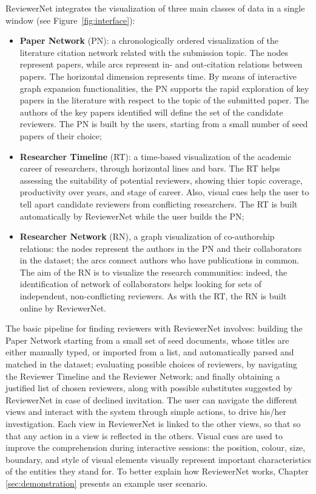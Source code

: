 ReviewerNet integrates the visualization of three main classes of data in a single window (see Figure~\ref{fig:interface}):

\begin{itemize}
\item  {\bf Paper Network} (PN): a chronologically ordered visualization of the literature citation network related with the submission topic. The nodes represent papers, while arcs represent in- and out-citation relations between papers. The horizontal dimension represents time. By means of interactive graph expansion functionalities, the PN supports the rapid exploration of key papers in the literature with respect to the topic of the submitted paper. The authors of the key papers identified will define the set of the candidate reviewers. The PN is built by the users, starting from a small number of seed papers of their choice;
\item  {\bf Researcher Timeline} (RT): a time-based visualization of the academic career of researchers, through horizontal lines and bars. The RT helps assessing the suitability of potential reviewers, showing thier topic coverage, productivity over years, and stage of career. Also, visual cues help the user to tell apart candidate reviewers from conflicting researchers. The RT is built automatically by ReviewerNet while the user builds the PN;
\item  {\bf Researcher Network} (RN), a graph visualization of co-authorship relations: the nodes represent the authors in the PN and their collaborators in the dataset; the arcs connect authors who have publications in common. The aim of the RN is to visualize the research communities: indeed, the identification of network of collaborators helps looking for sets of independent, non-conflicting reviewers. As with the RT, the RN is built online by ReviewerNet.
\end{itemize}
%
The basic pipeline for finding reviewers with ReviewerNet involves: building the Paper Network starting from a small set of seed documents, whose titles are either manually typed, or imported from a list, and automatically parsed and matched in the dataset; evaluating possible choices of reviewers, by navigating the Reviewer Timeline and the Reviewer Network; and finally obtaining a justified list of chosen reviewers, along with possible substitutes suggested by ReviewerNet in case of declined invitation. The user can navigate the different views and interact with the system through simple actions, to drive his/her investigation. Each view in ReviewerNet is linked to the other views, so that so that any action in a view is reflected in the others. Visual cues are used to improve the comprehension during interactive sessions: the position, colour, size, boundary, and style of visual elements visually represent important characteristics of the entities they stand for. To better explain how ReviewerNet works, Chapter \ref{sec:demonstration} presents an example user scenario. %

